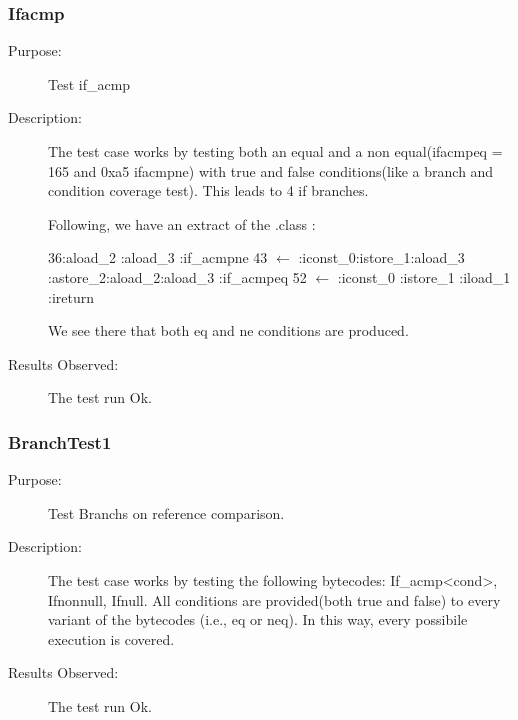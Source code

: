 \subsubsection{Ifacmp}
\begin{description}
   \item[Purpose:]
Test if\_acmp
   \item[Description:]
The test case works by testing both an equal and a non
equal(ifacmpeq = 165 and 0xa5 ifacmpne) with true and false
conditions(like a branch and condition coverage test). This leads to
4 if branches.

Following, we have an extract of the .class :

36:aload\_2 :aload\_3 :if\_acmpne       43 $
\longleftarrow $ :iconst\_0:istore\_1:aload\_3 :astore\_2:aload\_2:aload\_3        :if\_acmpeq       52 $ \longleftarrow
$ :iconst\_0        :istore\_1        :iload\_1         :ireturn         \newline

We see there that both eq and ne conditions are produced.
   \item[Results Observed:]
The test run Ok.
\end{description}

\subsubsection{BranchTest1}
\begin{description}
   \item[Purpose:]
Test Branchs on reference comparison.
   \item[Description:]
The test case works by testing the following bytecodes:
\newline If\_acmp\textless cond\textgreater, Ifnonnull, Ifnull. All
conditions are provided(both true and false) to every variant of the
bytecodes (i.e., eq or neq). In this way, every possibile execution
is covered.
  \item[Results Observed:]
The test run Ok.
\end{description}

